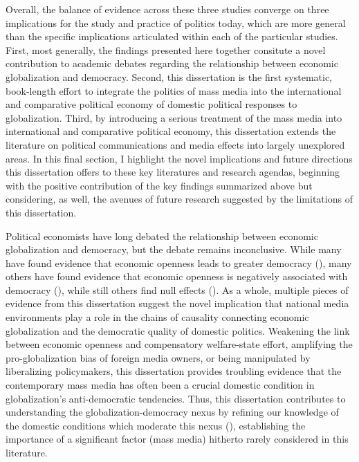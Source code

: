 \documentclass[12pt]{report}
\begin{document}
Overall, the balance of evidence across these three studies converge on three implications for the study and practice of politics today, which are more general than the specific implications articulated within each of the particular studies. First, most generally, the findings presented here together consitute a novel contribution to academic debates regarding the relationship between economic globalization and democracy. Second, this dissertation is the first systematic, book-length effort to integrate the politics of mass media into the international and comparative political economy of domestic political responses to globalization. Third, by introducing a serious treatment of the mass media into international and comparative political economy, this dissertation extends the literature on political communications and media effects into largely unexplored areas. In this final section, I highlight the novel implications and future directions this dissertation offers to these key literatures and research agendas, beginning with the positive contribution of the key findings summarized above but considering, as well, the avenues of future research suggested by the limitations of this dissertation.

Political economists have long debated the relationship between economic globalization and democracy, but the debate remains inconclusive. While many have found evidence that economic openness leads to greater democracy (\citealt{Lipset:1959wr,EICHENGREEN:2008gg,LopezCordova:2005wh}), many others have found evidence that economic openness is negatively associated with democracy (\citealt{acemoglu2009economic,Li:2003vj,boix2003democracy}), while still others find null effects (\citealt{ECOT:ECOT226,Decker:2009df,Milner:2009hi}). As a whole, multiple pieces of evidence from this dissertation suggest the novel implication that national media environments play a role in the chains of causality connecting economic globalization and the democratic quality of domestic politics. Weakening the link between economic openness and compensatory welfare-state effort, amplifying the pro-globalization bias of foreign media owners, or being manipulated by liberalizing policymakers, this dissertation provides troubling evidence that the contemporary mass media has often been a crucial domestic condition in globalization's anti-democratic tendencies. Thus, this dissertation contributes to understanding the globalization-democracy nexus by refining our knowledge of the domestic conditions which moderate this nexus (\citealt{Milner:2009hi,boix2003democracy}), establishing the importance of a significant factor (mass media) hitherto rarely considered in this literature.
\end{document}
